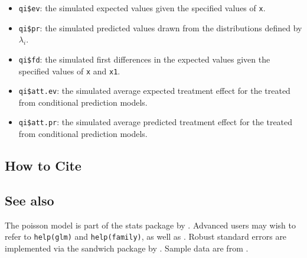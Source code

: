 \begin{itemize}
   \begin{itemize}
   \item {\tt qi\$ev}: the simulated expected values given the
     specified values of {\tt x}.
   \item {\tt qi\$pr}: the simulated predicted values drawn from the
     distributions defined by $\lambda_i$.
   \item {\tt qi\$fd}: the simulated first differences in the expected
     values given the specified values of {\tt x} and {\tt x1}.
   \item {\tt qi\$att.ev}: the simulated average expected treatment
     effect for the treated from conditional prediction models.  
   \item {\tt qi\$att.pr}: the simulated average predicted treatment
     effect for the treated from conditional prediction models.  
   \end{itemize}
\end{itemize}

\subsection* {How to Cite} 




\subsection* {See also}
The poisson model is part of the stats package by \citet{VenRip02}.
Advanced users may wish to refer to \texttt{help(glm)} and
\texttt{help(family)}, as well as \cite{McCNel89}. Robust standard
errors are implemented via the sandwich package by \citet{Zeileis04}.
Sample data are from \cite{Martin92}.



 


